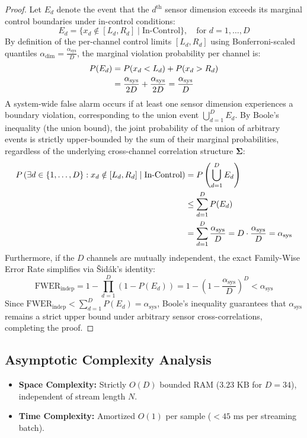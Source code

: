 \documentclass[a4paper,fleqn]{cas-sc}
\begin{document}
\begin{proof}
Let $E_d$ denote the event that the $d^{\text{th}}$ sensor dimension exceeds its marginal control boundaries under in-control conditions:
\begin{equation}
E_d = \{ x_d \notin [L_d, R_d] \mid \text{In-Control} \}, \quad \text{for } d = 1, \dots, D
\end{equation}
By definition of the per-channel control limits $[L_d, R_d]$ using Bonferroni-scaled quantiles $\alpha_{\text{dim}} = \frac{\alpha_{\text{sys}}}{D}$, the marginal violation probability per channel is:
\begin{align}
P(E_d) &= P(x_d < L_d) + P(x_d > R_d) \notag \\
&= \frac{\alpha_{\text{sys}}}{2D} + \frac{\alpha_{\text{sys}}}{2D} = \frac{\alpha_{\text{sys}}}{D}
\end{align}
A system-wide false alarm occurs if at least one sensor dimension experiences a boundary violation, corresponding to the union event $\bigcup_{d=1}^D E_d$. By Boole's inequality (the union bound), the joint probability of the union of arbitrary events is strictly upper-bounded by the sum of their marginal probabilities, regardless of the underlying cross-channel correlation structure $\boldsymbol{\Sigma}$:
\begin{align}
P\left( \exists d \in \{1,\dots,D\}: x_d \notin [L_d, R_d] \mid \text{In-Control} \right) &= P\left( \bigcup_{d=1}^D E_d \right) \notag \\
&\le \sum_{d=1}^D P(E_d) \notag \\
&= \sum_{d=1}^D \frac{\alpha_{\text{sys}}}{D} = D \cdot \frac{\alpha_{\text{sys}}}{D} = \alpha_{\text{sys}}
\end{align}
Furthermore, if the $D$ channels are mutually independent, the exact Family-Wise Error Rate simplifies via Šidák's identity:
\begin{equation}
\text{FWER}_{\text{indep}} = 1 - \prod_{d=1}^D \left(1 - P(E_d)\right) = 1 - \left(1 - \frac{\alpha_{\text{sys}}}{D}\right)^D < \alpha_{\text{sys}}
\end{equation}
Since $\text{FWER}_{\text{indep}} < \sum_{d=1}^D P(E_d) = \alpha_{\text{sys}}$, Boole's inequality guarantees that $\alpha_{\text{sys}}$ remains a strict upper bound under arbitrary sensor cross-correlations, completing the proof.
\end{proof}

\subsection{Asymptotic Complexity Analysis}
\begin{itemize}
    \item \textbf{Space Complexity:} Strictly $O(D)$ bounded RAM ($3.23\text{ KB}$ for $D=34$), independent of stream length $N$.
    \item \textbf{Time Complexity:} Amortized $O(1)$ per sample ($< 45\text{ ms}$ per streaming batch).
\end{itemize}
\end{document}
